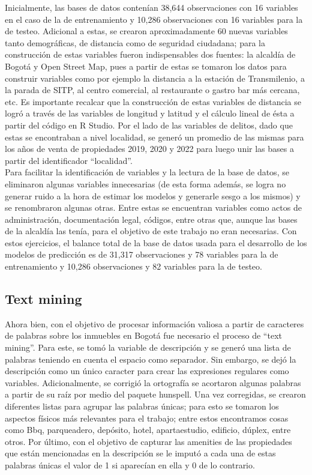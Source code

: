 \documentclass[10pt]{article}
\begin{document}
Inicialmente, las bases de datos contenían 38,644 observaciones con 16 variables en el caso de la de entrenamiento y 10,286 observaciones con 16 variables para la de testeo. Adicional a estas, se crearon aproximadamente 60 nuevas variables tanto demográficas, de distancia como de seguridad ciudadana; para la construcción de estas variables fueron indispensables dos fuentes: la alcaldía de Bogotá y Open Street Map, pues a partir de estas se tomaron los datos para construir variables como por ejemplo la distancia a la estación de Transmilenio, a la parada de SITP, al centro comercial, al restaurante o gastro bar más cercana, etc. Es importante recalcar que la construcción de estas variables de distancia se logró a través de las variables de longitud y latitud y el cálculo lineal de ésta a partir del código en R Studio. Por el lado de las variables de delitos, dado que estas se encontraban a nivel localidad, se generó un promedio de las mismas para los años de venta de propiedades 2019, 2020 y 2022 para luego unir las bases a partir del identificador “localidad”.  \\

Para facilitar la identificación de variables y la lectura de la base de datos, se eliminaron algunas variables innecesarias (de esta forma además, se logra no generar ruido a la hora de estimar los modelos y generarle sesgo a los mismos) y se renombraron algunas otras. Entre estas se encuentran variables como actos de administración, documentación legal, códigos, entre otras que, aunque las bases de la alcaldía las tenía, para el objetivo de este trabajo no eran necesarias. Con estos ejercicios, el balance total de la base de datos usada para el desarrollo de los modelos de predicción es de 31,317 observaciones y 78 variables para la de entrenamiento y 10,286 observaciones y 82 variables para la de testeo.

\subsection{Text mining}
Ahora bien, con el objetivo de procesar información valiosa a partir de caracteres de palabras sobre los inmuebles en Bogotá fue necesario el proceso de “text mining”. Para este, se tomó la variable de descripción y se generó una lista de palabras teniendo en cuenta el espacio como separador. Sin embargo, se dejó la descripción como un único caracter para crear las expresiones regulares como variables. Adicionalmente, se corrigió la ortografía se acortaron algunas palabras a partir de su raíz por medio del paquete hunspell. Una vez corregidas, se crearon diferentes listas para agrupar las palabras únicas; para esto se tomaron los aspectos físicos más relevantes para el trabajo; entre estos encontramos cosas como Bbq, parqueadero, depósito, hotel, apartaestudio, edificio, dúplex, entre otros. Por último, con el objetivo de capturar las amenities de las propiedades que están mencionadas en la descripción se le imputó a cada una de estas palabras únicas el valor de 1 si aparecían en ella y 0 de lo contrario.  \\
\end{document}

